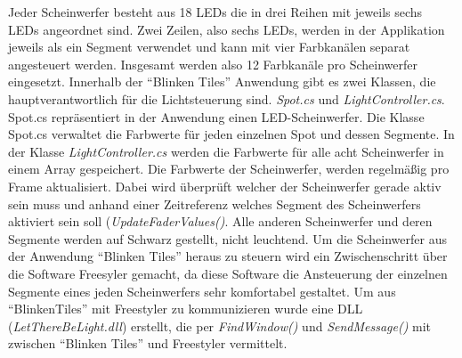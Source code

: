 Jeder Scheinwerfer besteht aus 18 LEDs die in drei Reihen mit jeweils sechs LEDs angeordnet sind. Zwei Zeilen, also sechs LEDs, werden in der Applikation jeweils als ein Segment verwendet und  kann mit vier Farbkanälen separat angesteuert werden. Insgesamt werden also 12 Farbkanäle pro Scheinwerfer eingesetzt. Innerhalb der "`Blinken Tiles"' Anwendung gibt es zwei Klassen, die hauptverantwortlich für die Lichtsteuerung sind. \emph{Spot.cs} und \emph{LightController.cs}. Spot.cs repräsentiert in der Anwendung einen LED-Scheinwerfer. Die Klasse Spot.cs verwaltet die Farbwerte für jeden einzelnen Spot und dessen Segmente. In der Klasse \emph{LightController.cs} werden die Farbwerte für alle acht Scheinwerfer in einem Array gespeichert. Die Farbwerte der Scheinwerfer, werden regelmäßig pro Frame aktualisiert. Dabei wird überprüft welcher der Scheinwerfer gerade aktiv sein muss und anhand einer Zeitreferenz welches Segment des Scheinwerfers aktiviert sein soll (\emph{UpdateFaderValues()}. Alle anderen Scheinwerfer und deren Segmente werden auf Schwarz gestellt, nicht leuchtend. 
Um die Scheinwerfer aus der Anwendung "`Blinken Tiles"' heraus zu steuern wird ein Zwischenschritt über die Software Freesyler gemacht, da diese Software die Ansteuerung der einzelnen Segmente eines jeden Scheinwerfers sehr komfortabel gestaltet. Um aus "`BlinkenTiles"' mit Freestyler zu kommunizieren wurde eine DLL (\emph{LetThereBeLight.dll}) erstellt, die per \emph{FindWindow()} und \emph{SendMessage()} mit zwischen "`Blinken Tiles"' und Freestyler vermittelt.


